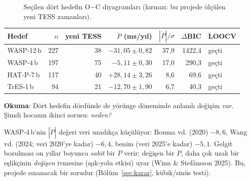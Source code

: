 \begin{figure}[H]
\centering
{}
\caption{Seçilen dört hedefin O$-$C diyagramları (kırmızı: bu projede ölçülen yeni TESS zamanları).}
\label{fig:dort}
\end{figure}

\begin{center}
\small
\begin{tabular}{l r r r r r l}
\toprule
Hedef & $n$ & yeni TESS & $\dot P$ (ms/yıl) & $|\dot P|/\sigma$ & $\Delta$BIC & LOOCV\\
\midrule
WASP-12\,b & 227 & 38 & $-31{,}05\pm0{,}82$ & 37,9 & 1422,4 & geçti\\
WASP-4\,b  & 197 & 75 & $-5{,}11\pm0{,}30$  & 17,0 & 290,3  & geçti\\
HAT-P-7\,b & 117 & 40 & $+28{,}14\pm3{,}26$ & 8,6  & 69,6   & geçti\\
TrES-1\,b  & 94  & 21 & $-12{,}70\pm1{,}90$ & 6,7  & 40,3   & geçti\\
\bottomrule
\end{tabular}
\end{center}

\textbf{Okuma}: Dört hedefin dördünde de yörünge döneminde anlamlı değişim \emph{var}. Şimdi hocanın ikinci sorusu:
\emph{neden?}

\begin{dikkat}
WASP-4\,b'nin $|\dot P|$ değeri veri uzadıkça küçülüyor: Bouma vd. (2020) $-8{,}6$, Wang vd. (2024; veri 2020'ye kadar)
$-6{,}4$, benim (veri 2025'e kadar) $-5{,}1$\msyil. Gelgit bozulması on yıllar boyunca \emph{sabit} bir $\dot P$
verir; değişen bir $\dot P$, daha çok uzak bir eşlikçinin \emph{değişen} ivmesine (ışık-yolu etkisi) uyar
(Winn \& Stefánsson 2025). Bu, projede sınanacak bir sorudur (Bölüm~\ref{sec:karar}, kübik/sinüs testi).
\end{dikkat}

